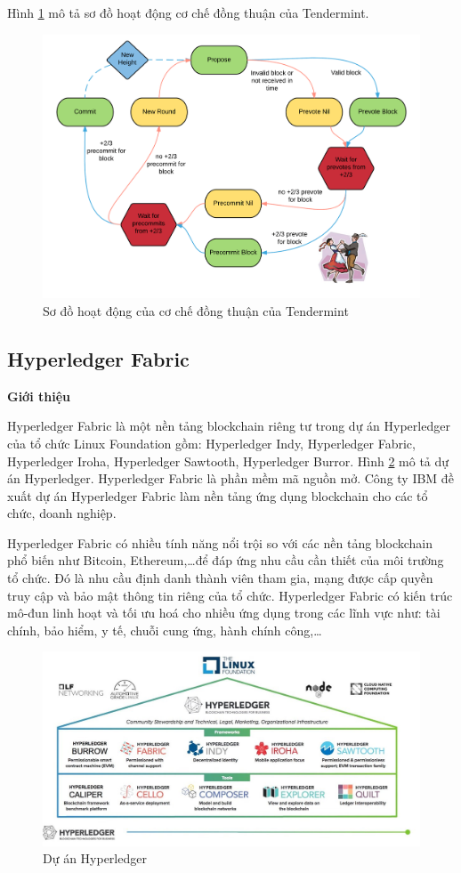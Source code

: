 Hình \ref{fig:bc_consensus} mô tả sơ đồ hoạt động cơ chế đồng thuận của Tendermint.
\begin{figure}[htbp]
\centering
\includegraphics[width=.9\linewidth]{img/bc_consensus.png}
\caption{Sơ đồ hoạt động của cơ chế đồng thuận của Tendermint}
\label{fig:bc_consensus}
\end{figure}

\subsection{Hyperledger Fabric}

\textbf{Giới thiệu}

Hyperledger Fabric là một nền tảng blockchain riêng tư trong dự án Hyperledger của tổ chức Linux Foundation gồm: Hyperledger Indy, Hyperledger Fabric, Hyperledger Iroha, Hyperledger Sawtooth, Hyperledger Burror.
Hình \ref{fig:hlf_um} mô tả dự án Hyperledger.
Hyperledger Fabric là phần mềm mã nguồn mở.
Công ty IBM đề xuất dự án Hyperledger Fabric làm nền tảng ứng dụng blockchain cho các tổ chức, doanh nghiệp. 

Hyperledger Fabric có nhiều tính năng nổi trội so với các nền tảng blockchain phổ biến như Bitcoin, Ethereum,\ldots để đáp ứng nhu cầu cần thiết của môi trường tổ chức.
Đó là nhu cầu định danh thành viên tham gia, mạng được cấp quyền truy cập và bảo mật thông tin riêng của tổ chức. Hyperledger Fabric có kiến trúc mô-đun linh hoạt và tối ưu hoá cho nhiều ứng dụng trong các lĩnh vực như: tài chính, bảo hiểm, y tế, chuỗi cung ứng, hành chính công,\ldots{}

\begin{figure}[htbp]
\centering
\includegraphics[width=.9\linewidth]{img/hlf_um.jpg}
\caption{Dự án Hyperledger}
\label{fig:hlf_um}
\end{figure}

